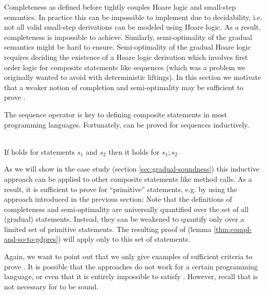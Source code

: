Completeness as defined before tightly couples Hoare logic and small-step semantics.
In practice this can be impossible to implement due to decidability, i.e. not all valid small-step derivations can be modeled using Hoare logic.
As a result, completeness is impossible to achieve.
Similarly, semi-optimality of the gradual semantics might be hard to ensure.
Semi-optimality of the gradual Hoare logic requires deciding the existence of a Hoare logic derivation which involves first order logic for composite statements like sequences (which was a problem we originally wanted to avoid with deterministic liftings).
In this section we motivate that a weaker notion of completion and semi-optimality may be sufficient to prove .

The sequence operator \ttt{;} is key to defining composite statements in most programming languages.
Fortunately,  can be proved for sequences inductively.
\begin{lemma}
    \label{lemma:gdpres-seq}~\\
    If  holds for statements $s_1$ and $s_2$ then it holds for $s_1;s_2$
\end{lemma}

As we will show in the case study (section \ref{sec:gradual-soundness}) this inductive approach can be applied to other composite statements like method calls.
As a result, it is sufficient to prove  for “primitive” statements, e.g. by using the approach introduced in the previous section:
Note that the definitions of completeness and semi-optimality are universally quantified over the set of all (gradual) statements.
Instead, they can be weakened to quantify only over a limited set of primitive statements.
The resulting proof of  (lemma \ref{thm:compl-and-so-to-gdpres}) will apply only to this set of statements.

Again, we want to point out that we only give examples of sufficient criteria to prove .
It is possible that the approaches do not work for a certain programming language, or even that it is entirely impossible to satisfy .
However, recall that  is not necessary for \gvl to be sound.
